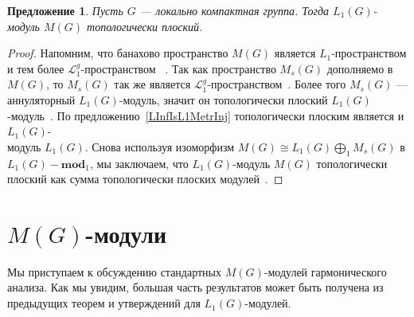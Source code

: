 \documentclass{article}
\numberwithin{equation}{section}
\theoremstyle{plain}
\newtheorem{propos}{Предложение}
\theoremstyle{definition}
\newtheorem{proof}{Доказательство}\def\theproof{}
\newcommand{\isom}{\mathop{\mathbin{\cong}}}
\begin{document}
\begin{fulltext}
\begin{propos}\label{MeasAlgIsL1TopFlat} Пусть $G$ --- локально компактная
группа. Тогда $L_1(G)$-\\модуль $M(G)$ топологически плоский.
\end{propos}
\begin{proof} Напомним, что банахово пространство $M(G)$ является
$L_1$-пространством и тем более $\mathscr{L}_1^g$-пространством
~\cite[пункт~3.13, упражнение~4.7(b)]{DefFloTensNorOpId}. Так как пространство
$M_s(G)$ дополняемо в $M(G)$, то $M_s(G)$ так же является
$\mathscr{L}_1^g$-пространством~\cite[следствие~23.2.1(2)]{DefFloTensNorOpId}.
Более того $M_s(G)$ --- аннуляторный $L_1(G)$-модуль, значит он топологически
плоский $L_1(G)$-модуль~\cite[предложение~3.6]{NemGeomProjInjFlatBanMod}. По
предложению~\ref{LInfIsL1MetrInj} топологически плоским является и
$L_1(G)$-\\модуль $L_1(G)$. Снова используя изоморфизм $M(G)\isom
L_1(G)\bigoplus_1 M_s(G)$ в $L_1(G)-\mathbf{mod}_1$, мы заключаем, что
$L_1(G)$-модуль $M(G)$ топологически плоский как сумма топологически плоских
модулей~\cite[предложение~2.27]{NemGeomProjInjFlatBanMod}.
\end{proof}


\section{\texorpdfstring{$M(G)$}{M (G)}-модули}\label{SubSectionMGModules}

Мы приступаем к обсуждению стандартных $M(G)$-модулей гармонического анализа.
Как мы увидим, большая часть результатов может быть получена из предыдущих
теорем и утверждений для $L_1(G)$-модулей.


\end{fulltext}
\end{document}
